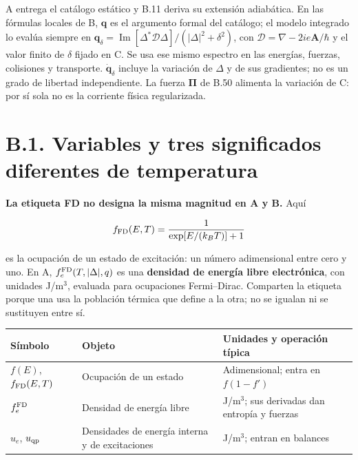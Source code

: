 \documentclass[
  spanish,
  10pt,
  a4paper,
]{article}
\newcounter{none} %
\begin{document}
A entrega el catálogo estático y B.11 deriva su extensión adiabática. En
las fórmulas locales de B, \(\mathbf q\) es el argumento formal del
catálogo; el modelo integrado lo evalúa siempre en
\(\mathbf q_\delta=\operatorname{Im}[\Delta^*\mathcal D\Delta]/(|\Delta|^2+\delta^2)\),
con \(\mathcal D=\nabla-2ie\mathbf A/\hbar\) y el valor finito de
\(\delta\) fijado en C. Se usa ese mismo espectro en las energías,
fuerzas, colisiones y transporte. \(\dot{\mathbf q}_\delta\) incluye la
variación de \(\Delta\) y de sus gradientes; no es un grado de libertad
independiente. La fuerza \(\boldsymbol\Pi\) de B.50 alimenta la
variación de C: por sí sola no es la corriente física regularizada.

\section{B.1. Variables y tres significados diferentes de
temperatura}\label{b.1.-variables-y-tres-significados-diferentes-de-temperatura}

\textbf{La etiqueta FD no designa la misma magnitud en A y B.} Aquí

\[
f_{\rm FD}(E,T)=\frac{1}{\exp[E/(k_BT)]+1}
\]

es la ocupación de un estado de excitación: un número adimensional entre
cero y uno. En A, \(f_e^{\rm FD}(T,|\Delta|,q)\) es una \textbf{densidad
de energía libre electrónica}, con unidades J/m\(^3\), evaluada para
ocupaciones Fermi--Dirac. Comparten la etiqueta porque una usa la
población térmica que define a la otra; no se igualan ni se sustituyen
entre sí.

{\def\LTcaptype{none} %
\begin{longtable}[]{@{}
  >{\raggedright\arraybackslash}p{}
  >{\raggedright\arraybackslash}p{}
  >{\raggedright\arraybackslash}p{}@{}}
\toprule\noalign{}
\begin{minipage}[b]{\linewidth}\raggedright
Símbolo
\end{minipage} & \begin{minipage}[b]{\linewidth}\raggedright
Objeto
\end{minipage} & \begin{minipage}[b]{\linewidth}\raggedright
Unidades y operación típica
\end{minipage} \\
\midrule\noalign{}
\endhead
\bottomrule\noalign{}
\endlastfoot
\(f(E)\), \(f_{\rm FD}(E,T)\) & Ocupación de un estado & Adimensional;
entra en \(f(1-f')\) \\
\(f_e^{\rm FD}\) & Densidad de energía libre & J/m\(^3\); sus derivadas
dan entropía y fuerzas \\
\(u_e\), \(u_{\rm qp}\) & Densidades de energía interna y de
excitaciones & J/m\(^3\); entran en balances \\
\end{longtable}
}
\end{document}
